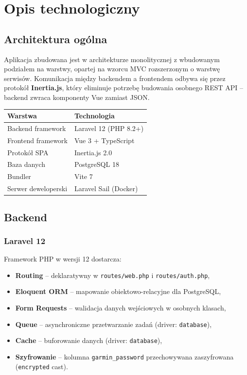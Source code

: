 \documentclass[12pt,a4paper]{report}
\begin{document}
\chapter{Opis technologiczny}
\label{ch:technologiczny}

\section{Architektura ogólna}

Aplikacja zbudowana jest w architekturze monolitycznej z wbudowanym podziałem na warstwy, opartej na wzorcu MVC rozszerzonym o warstwę serwisów. Komunikacja między backendem a frontendem odbywa się przez protokół \textbf{Inertia.js}, który eliminuje potrzebę budowania osobnego REST API -- backend zwraca komponenty Vue zamiast JSON.

\begin{center}
\begin{tabular}{|l|l|}
\hline
\textbf{Warstwa}       & \textbf{Technologia}               \\
\hline
Backend framework      & Laravel 12 (PHP 8.2+)              \\
Frontend framework     & Vue 3 + TypeScript                 \\
Protokół SPA           & Inertia.js 2.0                     \\
Baza danych            & PostgreSQL 18                      \\
Bundler                & Vite 7                             \\
Serwer deweloperski    & Laravel Sail (Docker)              \\
\hline
\end{tabular}
\end{center}

\section{Backend}

\subsection{Laravel 12}

Framework PHP w wersji 12 dostarcza:
\begin{itemize}[noitemsep]
    \item \textbf{Routing} -- deklaratywny w \texttt{routes/web.php} i \texttt{routes/auth.php},
    \item \textbf{Eloquent ORM} -- mapowanie obiektowo-relacyjne dla PostgreSQL,
    \item \textbf{Form Requests} -- walidacja danych wejściowych w osobnych klasach,
    \item \textbf{Queue} -- asynchroniczne przetwarzanie zadań (driver: \texttt{database}),
    \item \textbf{Cache} -- buforowanie danych (driver: \texttt{database}),
    \item \textbf{Szyfrowanie} -- kolumna \texttt{garmin\_password} przechowywana zaszyfrowana (\texttt{encrypted} cast).
\end{itemize}
\end{document}

